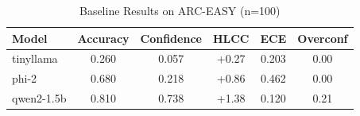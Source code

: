 \begin{table}[h]
\centering
\caption{Baseline Results on ARC-EASY (n=100)}
\begin{tabular}{lccccc}
\toprule
Model & Accuracy & Confidence & HLCC & ECE & Overconf \\
\midrule
tinyllama & 0.260 & 0.057 & +0.27 & 0.203 & 0.00 \\
phi-2 & 0.680 & 0.218 & +0.86 & 0.462 & 0.00 \\
qwen2-1.5b & 0.810 & 0.738 & +1.38 & 0.120 & 0.21 \\
\bottomrule
\end{tabular}
\label{tab:baseline_arc-easy}
\end{table}